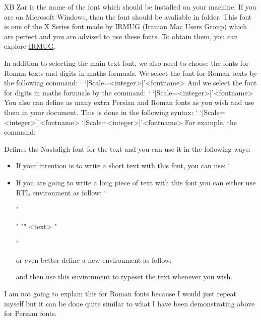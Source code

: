 \begin{drivers} {\UsageFont XB Zar} is the name of the font which should be installed on your machine. If you are on \textsf{Microsoft Windows}, then the font should be avaliable in  folder. This font is one of the \textsf{X Series} font made by \textsf{IRMUG} (Iranian Mac Users Group) which are perfect and you are advised to use these fonts. To obtain them, you can explore \href{http://wiki.irmug.org/index.php/X_Series_2}{\textsf{IRMUG}}.\end{drivers}

In addition to selecting the main text font, we also need to choose the fonts for Roman texts and digits in maths formuals. We select the font for Roman texts by the following command:
\begingroup
\catcode`
  \Mac  \setromantextfont`[Scale=<integer>]'{<fontname>}
\endgroup
And we select the font for digits in maths formuals by the command:
\begingroup
\catcode`
  \Mac  \setdigitfont`[Scale=<integer>]'{<fontname>}
\endgroup
You also can define as many extra Persian and Roman fonts as you wish and use them in your document. This is done in the following syntax:
\begingroup
\catcode`
  \Mac  {}\n\fontname`[Scale=<integer>]'{<fontname>}
  \Mac  {}\n\fontname`[Scale=<integer>]'{<fontname>}
\endgroup
For example, the command:
\begin{LVerb}
\end{LVerb}
Defines the {\UsageFont Nastaligh} font for the text and you can use it in the following ways:
\begin{itemize}
\item If your intention is to write  a short text with this font, you can use:
\begingroup
\catcode`
  \Mac {}
\endgroup
\item If you are going to write a long piece of text with this font you can either use {\UsageFont RTL} environment as follow:
\begingroup
\catcode`
\begin{Ex}
  "\begin{RTL}" 
  "\nastaligh"
  <text>
 "\end{RTL}"
\end{Ex}
\endgroup
or even better define a new environment as follow:
\begin{LVerb}
  \newenvironment{Nastaligh}{\begin{RTL}\nastaligh}
  {\end{RTL}}
\end{LVerb}
and then use this environment to typeset the text whenever you wish.
\end{itemize}
I am not going to explain this for Roman fonts because I would just repeat myself but it can be done quite similar to what I have been demonstrating above for Persian fonts.
